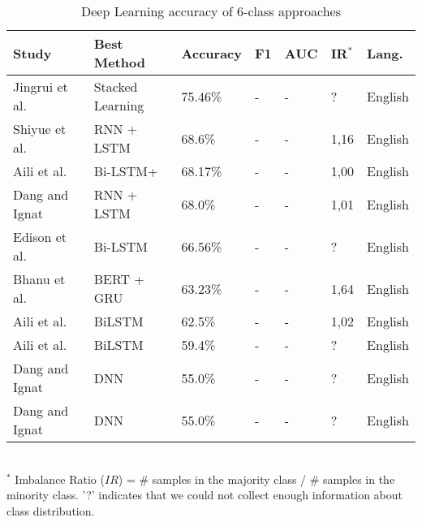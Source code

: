 \begin{table}[ht]
    \caption{Deep Learning accuracy of 6-class approaches }
    \label{tab:DL_performance_6class}
    \centering
    \begin{tabular}{l l l l l l l}
        \toprule
        \textbf{Study} & \textbf{Best Method} & \textbf{Accuracy} & \textbf{F1} & \textbf{AUC} & \textbf{IR$^*$} & \textbf{Lang.} \\ 
        \midrule
        Jingrui et al.~\cite{Hou2021_lr122} & Stacked Learning & 75.46\% & - & - & ? & English \\
        Shiyue et al.~\cite{Zhang2018_lr41} & RNN + LSTM & 68.6\% & - & - & 1,16 & English \\
        Aili et al.~\cite{Shen2017_lr31} & Bi-LSTM+ & 68.17\% & - & - & 1,00 & English \\
        Dang and Ignat~\cite{Dang2017_lr23} & RNN + LSTM & 68.0\% & - & - & 1,01 & English \\
        Edison et al.~\cite{Marrese-Taylor2019_lr85} & Bi-LSTM & 66.56\% & - & - & ? & English \\
        Bhanu et al.~\cite{Guda2020_lr38} & BERT + GRU & 63.23\% & - & - & 1,64 & English \\
        Aili et al.~\cite{Shen2020_lr2009} & BiLSTM & 62.5\% & - & - & 1,02 & English \\
        Aili et al.~\cite{Shen2019_lr1061} & BiLSTM & 59.4\% & - & - & ? & English \\
        Dang and Ignat~\cite{Dang2016_lr24} & DNN & 55.0\% & - & - & ? & English \\
        Dang and Ignat~\cite{Dang2016_lr89} & DNN & 55.0\% & - & - & ? & English \\
        \bottomrule
    \end{tabular}
    \\ \vspace{0.1cm}
    \footnotesize
    $^*$ Imbalance Ratio ($IR$) = \# samples in the majority class / \# samples in the minority class. '?' indicates that we could not collect enough information about class distribution.
\end{table}